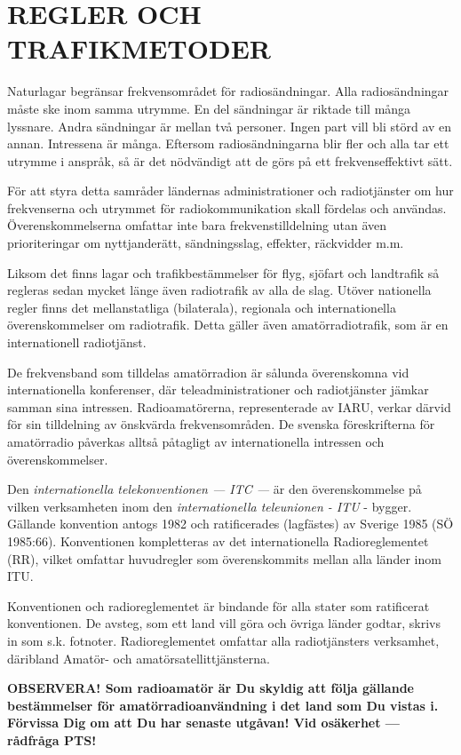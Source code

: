 \part{REGLER OCH TRAFIKMETODER}

Naturlagar begränsar frekvensområdet för radiosändningar. Alla
radiosändningar måste ske inom samma utrymme. En del sändningar är
riktade till många lyssnare. Andra sändningar är mellan två
personer. Ingen part vill bli störd av en annan. Intressena är
många. Eftersom radiosändningarna blir fler och alla tar ett utrymme i
anspråk, så är det nödvändigt att de görs på ett frekvenseffektivt
sätt.

För att styra detta samråder ländernas administrationer och
radiotjänster om hur frekvenserna och utrymmet för radiokommunikation
skall fördelas och användas.  Överenskommelserna omfattar inte bara
frekvenstilldelning utan även prioriteringar om nyttjanderätt,
sändningsslag, effekter, räckvidder m.m.

Liksom det finns lagar och trafikbestämmelser för flyg, sjöfart och
landtrafik så regleras sedan mycket länge även radiotrafik av alla de
slag. Utöver nationella regler finns det mellanstatliga (bilaterala),
regionala och internationella överenskommelser om radiotrafik. Detta
gäller även amatörradiotrafik, som är en internationell radiotjänst.

De frekvensband som tilldelas amatörradion är sålunda överenskomna vid
internationella konferenser, där teleadministrationer och
radiotjänster jämkar samman sina intressen. Radioamatörerna,
representerade av IARU, verkar därvid för sin tilldelning av önskvärda
frekvensområden. De svenska föreskrifterna för amatörradio påverkas
alltså påtagligt av internationella intressen och överenskommelser.

Den \emph{internationella telekonventionen --- ITC ---} är den
överenskommelse på vilken verksamheten inom den \emph{internationella
  teleunionen - ITU} - bygger. Gällande konvention antogs 1982 och
ratificerades (lagfästes) av Sverige 1985 (SÖ 1985:66). Konventionen
kompletteras av det internationella Radioreglementet (RR), vilket
omfattar huvudregler som överenskommits mellan alla länder inom ITU.


Konventionen och radioreglementet är bindande för alla stater som
ratificerat konventionen. De avsteg, som ett land vill göra och övriga
länder godtar, skrivs in som s.k. fotnoter. Radioreglementet omfattar
alla radiotjänsters verksamhet, däribland Amatör- och
amatörsatellittjänsterna.

\textbf{OBSERVERA!  Som radioamatör är Du skyldig att följa gällande
  bestämmelser för amatörradioanvändning i det land som Du vistas i.
  Förvissa Dig om att Du har senaste utgåvan!  Vid osäkerhet ---
  rådfråga PTS!}
